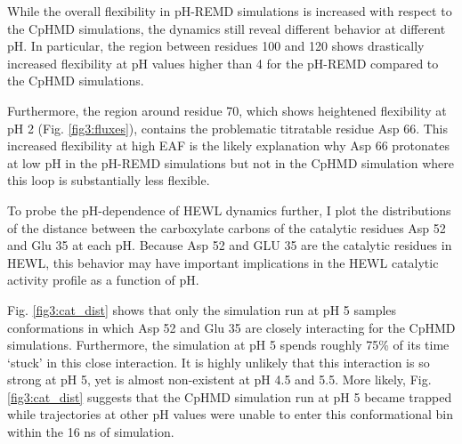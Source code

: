 While the overall flexibility in pH-REMD simulations is increased with respect
to the CpHMD simulations, the dynamics still reveal different behavior at
different pH.  In particular, the region between residues 100 and 120 shows
drastically increased flexibility at pH values higher than 4 for the pH-REMD
compared to the CpHMD simulations.

Furthermore, the region around residue 70, which shows heightened flexibility at
pH 2 (Fig. \ref{fig3:fluxes}), contains the problematic titratable residue Asp
66.  This increased flexibility at high EAF is the likely explanation why Asp 66
protonates at low pH in the pH-REMD simulations but not in the CpHMD simulation
where this loop is substantially less flexible.

To probe the pH-dependence of HEWL dynamics further, I plot the distributions
of the distance between the carboxylate carbons of the catalytic residues Asp 52
and Glu 35 at each pH.  Because Asp 52 and GLU 35 are the catalytic residues in
HEWL, this behavior may have important implications in the HEWL catalytic
activity profile as a function of pH.

Fig. \ref{fig3:cat_dist} shows that only the simulation run at pH 5 samples
conformations in which Asp 52 and Glu 35 are closely interacting for the CpHMD
simulations.  Furthermore, the simulation at pH 5 spends roughly 75\% of its
time `stuck' in this close interaction.  It is highly unlikely that this
interaction is so strong at pH 5, yet is almost non-existent at pH 4.5 and 5.5.
More likely, Fig. \ref{fig3:cat_dist} suggests that the CpHMD simulation run at
pH 5 became trapped while trajectories at other pH values were unable to enter
this conformational bin within the 16 ns of simulation.

